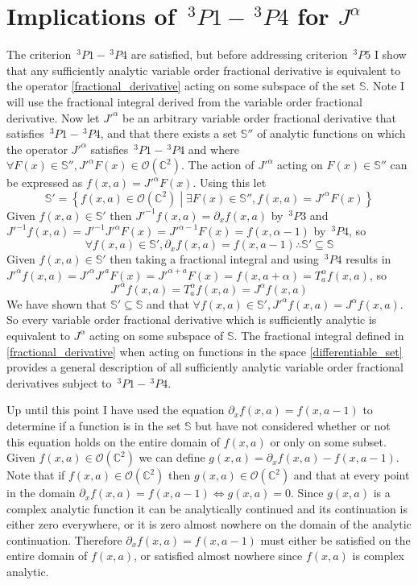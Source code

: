 \documentclass[%
 onecolumn,
 amsmath, amssymb, aps, pra, 10pt
]{revtex4-2}
\begin{document}
\section*{Implications of $\,^3P1 - \,^3P4$ for $J^{\alpha}$}
The criterion $\,^3P1 - \,^3P4$ are satisfied, but before addressing criterion $\,^3P5$ I show that any sufficiently analytic variable order fractional derivative is equivalent to the operator \eqref{fractional_derivative} acting on some subspace of the set $\mathbb{S}$. Note I will use the fractional integral derived from the variable order fractional derivative. Now let $J'^{\alpha}$ be an arbitrary variable order fractional derivative that satisfies $\,^3P1 - \,^3P4$, and that there exists a set $\mathbb{S}''$ of analytic functions on which the operator $J'^{\alpha}$ satisfies $\,^3P1 - \,^3P4$ and where $\forall F(x) \in \mathbb{S}'', J'^{\alpha}F(x) \in \mathcal{O}(\mathbb{C}^2)$. The action of $J'^{\alpha}$ acting on $F(x) \in \mathbb{S}''$ can be expressed as $f(x, a) = J'^{\alpha} F(x)$. Using this let
$$\mathbb{S}' = \left\lbrace f(x, a) \in \mathcal{O}(\mathbb{C}^2) \middle| \exists F(x) \in \mathbb{S}'', f(x, a) = J'^{\alpha} F(x) \right\rbrace$$
Given $f(x, a) \in \mathbb{S}'$ then $J'^{-1}f(x, a) = \partial_x f(x, a)$ by $\,^3P3$ and $J'^{-1} f(x, a) = J'^{-1}J'^{\alpha} F(x) = J'^{\alpha - 1} F(x) = f(x, \alpha - 1)$ by $\,^3P4$, so
$$\forall f(x, a) \in \mathbb{S}', \partial_x f(x, a) = f(x, a - 1) \therefore \mathbb{S}' \subseteq \mathbb{S}$$
Given $f(x, a) \in \mathbb{S}'$ then taking a fractional integral and using $\,^3P4$ results in $J'^{\alpha} f(x, a) = J'^{\alpha}J'^{a} F(x) = J'^{\alpha + a} F(x) = f(x, a + \alpha) = T_{a}^{\alpha} f(x, a)$, so
$$J'^{\alpha} f(x,a) = T_{a}^{\alpha} f(x, a) = J^{\alpha} f(x, a)$$
We have shown that $\mathbb{S}' \subseteq \mathbb{S}$ and that $\forall f(x, a) \in \mathbb{S}', J'^{\alpha} f(x, a) = J^{\alpha} f(x, a)$. So every variable order fractional derivative which is sufficiently analytic is equivalent to $J^{\alpha}$ acting on some subspace of $\mathbb{S}$. The fractional integral defined in \eqref{fractional_derivative} when acting on functions in the space \eqref{differentiable_set} provides a general description of all sufficiently analytic variable order fractional derivatives subject to $\,^3P1 - \,^3P4$.

Up until this point I have used the equation $\partial_x f(x, a) = f(x, a - 1)$ to determine if a function is in the set $\mathbb{S}$ but have not considered whether or not this equation holds on the entire domain of $f(x, a)$ or only on some subset. Given $f(x, a) \in \mathcal{O}(\mathbb{C}^2)$ we can define $g(x, a) = \partial_x f(x, a) - f(x, a - 1)$. Note that if $f(x, a) \in \mathcal{O}(\mathbb{C}^2)$ then $g(x, a) \in \mathcal{O}(\mathbb{C}^2)$ and that at every point in the domain $\partial_x f(x, a) = f(x, a - 1) \iff g(x, a) = 0$. Since $g(x, a)$ is a complex analytic function it can be analytically continued and its continuation is either zero everywhere, or it is zero almost nowhere on the domain of the analytic continuation. Therefore $\partial_x f(x, a) = f(x, a - 1)$ must either be satisfied on the entire domain of $f(x, a)$, or satisfied almost nowhere since $f(x, a)$ is complex analytic.
\end{document}
